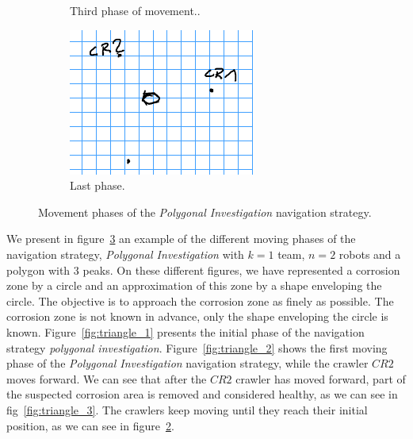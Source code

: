 \begin{figure}[h!]
\begin{subfigure}[t]{0.3\linewidth}
		\caption{Third phase of movement..}
		\label{fig:triangle_6}
	\end{subfigure}
	\hfill
	\begin{subfigure}[t]{0.3\linewidth}
		\centering
		\includegraphics[width=\linewidth]{graphics/triangle_7.png}
		\caption{Last phase.}
		\label{fig:triangle_7}
	\end{subfigure}
		\caption{Movement phases of the \textit{Polygonal Investigation} navigation strategy.}
		\label{fig:triangle}
\end{figure}

We present in figure~\ref{fig:triangle} an example of the different moving phases of the navigation strategy, \textit{Polygonal Investigation} with $k = 1$ team, $n = 2$ robots and a polygon with 3 peaks.
On these different figures, we have represented a corrosion zone by a circle and an approximation of this zone by a shape enveloping the circle.
The objective is to approach the corrosion zone as finely as possible.
The corrosion zone is not known in advance, only the shape enveloping the circle is known.
Figure~\ref{fig:triangle_1} presents the initial phase of the navigation strategy \textit{polygonal investigation}.
Figure~\ref{fig:triangle_2} shows the first moving phase of the \textit{Polygonal Investigation} navigation strategy, while the crawler $CR2$ moves forward.
We can see that after the $CR2$ crawler has moved forward, part of the suspected corrosion area is removed and considered healthy, as we can see in fig~\ref{fig:triangle_3}.
The crawlers keep moving until they reach their initial position, as we can see in figure~\ref{fig:triangle_7}.

